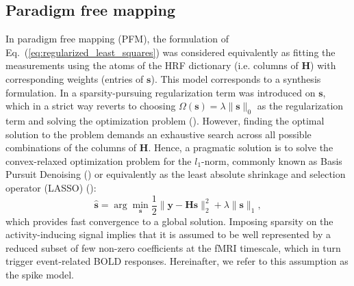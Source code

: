 \subsection{Paradigm free mapping}
 In paradigm free mapping (PFM), the formulation of Eq.~(\ref{eq:regularized_least_squares}) was considered equivalently as fitting the measurements using the atoms of the HRF dictionary (i.e. columns of $\mathbf{H}$) with corresponding weights (entries of $\mathbf{s}$). This model corresponds to a synthesis formulation. In \citealt{Gaudes2013Paradigmfreemapping} a sparsity-pursuing regularization term was introduced on $\mathbf{s}$, which in a strict way reverts to choosing \(\Omega(\mathbf{s})=\lambda \| \mathbf{s} \|_0\) as the regularization term and solving the optimization problem (\citealt{Bruckstein2009SparseSolutionsSystems}). However, finding the optimal solution to the problem demands an exhaustive search across all possible combinations of the columns of \(\mathbf{H}\). Hence, a  pragmatic solution is to solve the convex-relaxed optimization problem for the \(l_1\)-norm, commonly known as Basis Pursuit Denoising (\citealt{Chen2001BasisPursuitDenoising}) or equivalently as the least absolute shrinkage and selection operator (LASSO) (\citealt{Tibshirani1996RegressionShrinkageSelection}): 
\begin{equation}
    \label{eq:pfm_spike}
    \hat{\mathbf{s}} = \arg \min_{\mathbf{s}} \frac{1}{2} \| \mathbf{y} - \mathbf{Hs} \|_2^2 + \lambda \| \mathbf{s} \|_1,
\end{equation}
which provides fast convergence to a global solution. Imposing sparsity on the activity-inducing signal implies that it is assumed to be well represented by a reduced subset of few non-zero coefficients at the fMRI timescale, which in turn trigger event-related BOLD responses. Hereinafter, we refer to this assumption as the spike model. 


